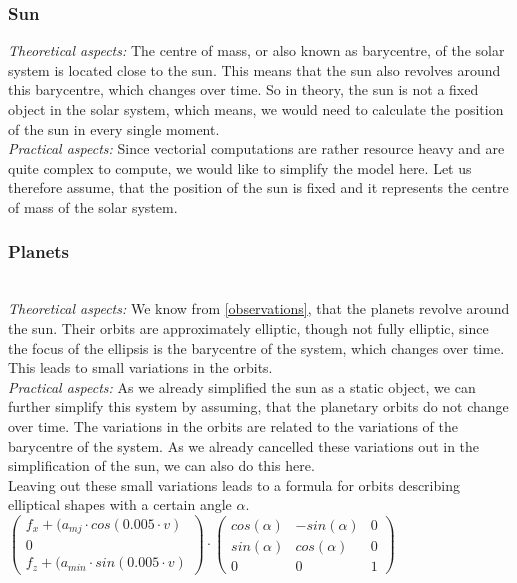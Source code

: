 \documentclass[conference,compsoc]{IEEEtran}
\begin{document}
\subsubsection{Sun}
\hfill\newline
\label{Sun}
\emph{Theoretical aspects: }The centre of mass, or also known as barycentre, of the solar system is located close to the sun. This means that the sun also revolves around this barycentre, which changes over time. So in theory, the sun is not a fixed object in the solar system, which means, we would need to calculate the position of the sun in every single moment.\\
\emph{Practical aspects: } Since vectorial computations are rather resource heavy and are quite complex to compute, we would like to simplify the model here. Let us therefore assume, that the position of the sun is fixed and it represents the centre of mass of the solar system. 
\subsubsection{Planets}\hfill\\
\label{Planets}
\emph{Theoretical aspects: } We know from \ref{observations}, that the planets revolve around the sun. Their orbits are approximately elliptic, though not fully elliptic, since the focus of the ellipsis is the barycentre of the system, which changes over time. This leads to small variations in the orbits. \\
\emph{Practical aspects: } As we already simplified the sun as a static object, we can further simplify this system by assuming, that the planetary orbits do not change over time. The variations in the orbits are related to the variations of the barycentre of the system. As we already cancelled these variations out in the simplification of the sun, we can also do this here. \\
Leaving out these small variations leads to a formula for orbits describing elliptical shapes with a certain angle $\alpha$.
$\begin{pmatrix}
	f_{x} + (a_{mj} \cdot cos(0.005 \cdot v) \\ 0\\
	f_{z} + (a_{min} \cdot sin(0.005 \cdot v)
\end{pmatrix} \cdot \begin{pmatrix}
	cos(\alpha) & -sin(\alpha) & 0 \\
	sin(\alpha) & cos(\alpha) & 0 \\
	0 & 0 & 1
\end{pmatrix} $
\end{document}
